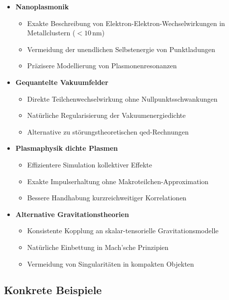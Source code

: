 \begin{itemize}
    \item \textbf{Nanoplasmonik}
    \begin{itemize}
        \item Exakte Beschreibung von Elektron-Elektron-Wechselwirkungen in Metallclustern ($<10$\,nm)
        \item Vermeidung der unendlichen Selbstenergie von Punktladungen
        \item Präzisere Modellierung von Plasmonenresonanzen
    \end{itemize}
    
    \item \textbf{Gequantelte Vakuumfelder}
    \begin{itemize}
        \item Direkte Teilchenwechselwirkung ohne Nullpunktsschwankungen
        \item Natürliche Regularisierung der Vakuumenergiedichte
        \item Alternative zu störungstheoretischen \gls{qed}-Rechnungen
    \end{itemize}
    
    \item \textbf{Plasmaphysik dichte Plasmen}
    \begin{itemize}
        \item Effizientere Simulation kollektiver Effekte
        \item Exakte Impulserhaltung ohne Makroteilchen-Approximation
        \item Bessere Handhabung kurzreichweitiger Korrelationen
    \end{itemize}
    
    \item \textbf{Alternative Gravitationstheorien}
    \begin{itemize}
        \item Konsistente Kopplung an skalar-tensorielle Gravitationsmodelle
        \item Natürliche Einbettung in Mach'sche Prinzipien \cite{Assis1999}
        \item Vermeidung von Singularitäten in kompakten Objekten
    \end{itemize}
\end{itemize}

\subsection{Konkrete Beispiele}

